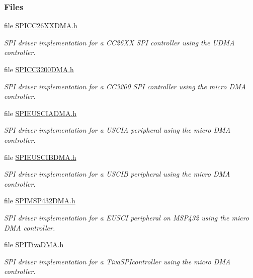 \subsubsection*{Files}
\begin{DoxyCompactItemize}
\item 
file \hyperlink{_s_p_i_c_c26_x_x_d_m_a_8h}{S\+P\+I\+C\+C26\+X\+X\+D\+M\+A.\+h}
\begin{DoxyCompactList}\small\item\em S\+P\+I driver implementation for a C\+C26\+X\+X S\+P\+I controller using the U\+D\+M\+A controller. \end{DoxyCompactList}\item 
file \hyperlink{_s_p_i_c_c3200_d_m_a_8h}{S\+P\+I\+C\+C3200\+D\+M\+A.\+h}
\begin{DoxyCompactList}\small\item\em S\+P\+I driver implementation for a C\+C3200 S\+P\+I controller using the micro D\+M\+A controller. \end{DoxyCompactList}\item 
file \hyperlink{_s_p_i_e_u_s_c_i_a_d_m_a_8h}{S\+P\+I\+E\+U\+S\+C\+I\+A\+D\+M\+A.\+h}
\begin{DoxyCompactList}\small\item\em S\+P\+I driver implementation for a U\+S\+C\+I\+A peripheral using the micro D\+M\+A controller. \end{DoxyCompactList}\item 
file \hyperlink{_s_p_i_e_u_s_c_i_b_d_m_a_8h}{S\+P\+I\+E\+U\+S\+C\+I\+B\+D\+M\+A.\+h}
\begin{DoxyCompactList}\small\item\em S\+P\+I driver implementation for a U\+S\+C\+I\+B peripheral using the micro D\+M\+A controller. \end{DoxyCompactList}\item 
file \hyperlink{_s_p_i_m_s_p432_d_m_a_8h}{S\+P\+I\+M\+S\+P432\+D\+M\+A.\+h}
\begin{DoxyCompactList}\small\item\em S\+P\+I driver implementation for a E\+U\+S\+C\+I peripheral on M\+S\+P432 using the micro D\+M\+A controller. \end{DoxyCompactList}\item 
file \hyperlink{_s_p_i_tiva_d_m_a_8h}{S\+P\+I\+Tiva\+D\+M\+A.\+h}
\begin{DoxyCompactList}\small\item\em S\+P\+I driver implementation for a Tiva\+S\+P\+Icontroller using the micro D\+M\+A controller. \end{DoxyCompactList}\item 

\end{DoxyCompactItemize}
